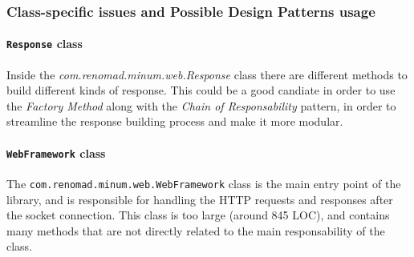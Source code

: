 \subsubsection{Class-specific issues and Possible Design Patterns usage}

\paragraph*{\texttt{Response} class} Inside the \textit{com.renomad.minum.web.Response} class there are different methods to build different kinds of response. This could be a good candiate in order to use the \textit{Factory Method} along with the \textit{Chain of Responsability} pattern, in order to streamline the response building process and make it more modular.

\paragraph*{\texttt{WebFramework} class} The \texttt{com.renomad.minum.web.WebFramework} class is the main entry point of the library, and is responsible for handling the HTTP requests and responses after the socket connection. This class is too large (around 845 LOC), and contains many methods that are not directly related to the main responsability of the class.


